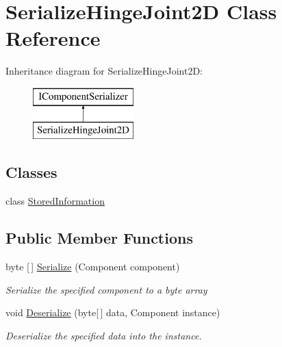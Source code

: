 \hypertarget{class_serialize_hinge_joint2_d}{}\section{Serialize\+Hinge\+Joint2D Class Reference}
\label{class_serialize_hinge_joint2_d}
Inheritance diagram for Serialize\+Hinge\+Joint2D\+:\begin{figure}[H]
\begin{center}
\leavevmode
\includegraphics[height=2.000000cm]{class_serialize_hinge_joint2_d}
\end{center}
\end{figure}
\subsection*{Classes}
\begin{DoxyCompactItemize}
\item 
class \hyperlink{class_serialize_hinge_joint2_d_1_1_stored_information}{Stored\+Information}
\end{DoxyCompactItemize}
\subsection*{Public Member Functions}
\begin{DoxyCompactItemize}
\item 
byte \mbox{[}$\,$\mbox{]} \hyperlink{class_serialize_hinge_joint2_d_a1e2a66811e08e2e87ea97ca28b65b844}{Serialize} (Component component)
\begin{DoxyCompactList}\small\item\em Serialize the specified component to a byte array \end{DoxyCompactList}\item 
void \hyperlink{class_serialize_hinge_joint2_d_aad33e878c1b722e388f05fe1892157e8}{Deserialize} (byte\mbox{[}$\,$\mbox{]} data, Component instance)
\begin{DoxyCompactList}\small\item\em Deserialize the specified data into the instance. \end{DoxyCompactList}\end{DoxyCompactItemize}


